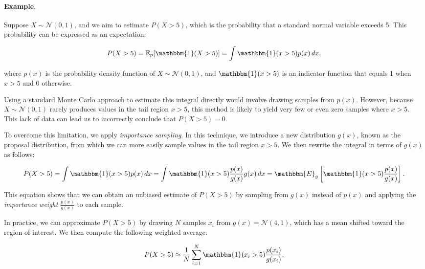         \paragraph{Example.}
        Suppose \( X \sim \mathcal{N}(0, 1) \), and we aim to estimate \( P(X > 5) \), which is the probability that a standard normal variable exceeds 5. This probability can be expressed as an expectation:
        
        \[
        P(X > 5) = \mathbb{E}_{p}[\mathbbm{1}(X > 5)] = \int \mathbbm{1}(x > 5) p(x) \, dx,
        \]
        
        where \( p(x) \) is the probability density function of \( X \sim \mathcal{N}(0, 1) \), and \( \mathbbm{1}(x > 5) \) is an indicator function that equals 1 when \( x > 5 \) and 0 otherwise.
        
        Using a standard Monte Carlo approach to estimate this integral directly would involve drawing samples from \( p(x) \). However, because \( X \sim \mathcal{N}(0,1) \) rarely produces values in the tail region \( x > 5 \), this method is likely to yield very few or even zero samples where \( x > 5 \). This lack of data can lead us to incorrectly conclude that \( P(X > 5) = 0 \).
        
        To overcome this limitation, we apply \emph{importance sampling}. In this technique, we introduce a new distribution \( g(x) \), known as the proposal distribution, from which we can more easily sample values in the tail region \( x > 5 \). We then rewrite the integral in terms of \( g(x) \) as follows:
        
        \[
        P(X > 5) = \int \mathbbm{1}(x > 5) p(x) \, dx = \int \mathbbm{1}(x > 5) \frac{p(x)}{g(x)} g(x) \, dx = \mathbbm{E}_{g} \left[ \mathbbm{1}(x > 5) \frac{p(x)}{g(x)} \right].
        \]
        
        This equation shows that we can obtain an unbiased estimate of \( P(X > 5) \) by sampling from \( g(x) \) instead of \( p(x) \) and applying the \emph{importance weight} \( \frac{p(x)}{g(x)} \) to each sample.
        
        In practice, we can approximate \( P(X > 5) \) by drawing \( N \) samples \( x_i \) from \( g(x) = \mathcal{N}(4, 1) \), which has a mean shifted toward the region of interest. We then compute the following weighted average:
        
        \[
        P(X > 5) \approx \frac{1}{N} \sum_{i=1}^{N} \mathbbm{1}(x_i > 5) \frac{p(x_i)}{g(x_i)},
        \]
        
